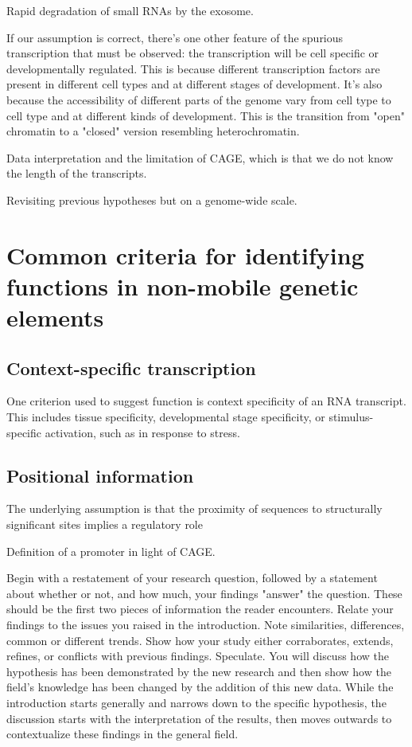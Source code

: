 Rapid degradation of small RNAs by the exosome.

If our assumption is correct, there's one other feature of the spurious transcription that must be observed: the transcription will be cell specific or developmentally regulated. This is because different transcription factors are present in different cell types and at different stages of development. It's also because the accessibility of different parts of the genome vary from cell type to cell type and at different kinds of development. This is the transition from "open" chromatin to a "closed" version resembling heterochromatin.

Data interpretation and the limitation of CAGE, which is that we do not know the length of the transcripts.

Revisiting previous hypotheses but on a genome-wide scale.

\section{Common criteria for identifying functions in non-mobile genetic elements}

\subsection{Context-specific transcription}

One criterion used to suggest function is context specificity of an RNA transcript. This includes tissue specificity, developmental stage specificity, or stimulus-specific activation, such as in response to stress.

\subsection{Positional information}

The underlying assumption is that the proximity of sequences to structurally significant sites implies a regulatory role

Definition of a promoter in light of CAGE.

Begin with a restatement of your research question, followed by a statement about whether or not, and how much, your findings "answer" the question. These should be the first two pieces of information the reader encounters. Relate your findings to the issues you raised in the introduction. Note similarities, differences, common or different trends.  Show how your study either corraborates, extends, refines, or conflicts with previous findings. Speculate. You will discuss how the hypothesis has been demonstrated by the new research and then show how the field's knowledge has been changed by the addition of this new data. While the introduction starts generally and narrows down to the specific hypothesis, the discussion starts with the interpretation of the results, then moves outwards to contextualize these findings in the general field.

